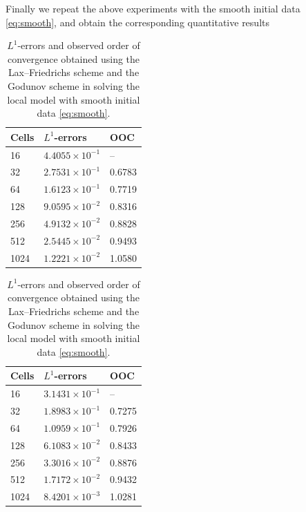 Finally we repeat the above experiments with the smooth initial data \eqref{eq:smooth}, and obtain the corresponding quantitative results
\begin{table}[H]
    \centering
    \begin{minipage}{0.45\textwidth}
        \centering
        \begin{tabular}{ |p{1.5cm}||p{2.2cm}| |p{1.5cm}| }
            \hline
            \textbf{Cells } & $L^{1}$-\textbf{errors} & \textbf{OOC} \\
            \hline
            16              & $4.4055 \times 10^{-1}$ & --           \\
            32              & $2.7531 \times 10^{-1}$ & 0.6783       \\
            64              & $1.6123 \times 10^{-1}$ & 0.7719       \\
            128             & $9.0595 \times 10^{-2}$ & 0.8316       \\
            256             & $4.9132 \times 10^{-2}$ & 0.8828       \\
            512             & $2.5445 \times 10^{-2}$ & 0.9493       \\
            1024            & $1.2221 \times 10^{-2}$ & 1.0580       \\
            \hline
        \end{tabular}
        \caption*{(a) Lax--Friedrichs scheme}
    \end{minipage}
    \hfill
    \begin{minipage}{0.5\textwidth}
        \centering
        \begin{tabular}{ |p{1.5cm}||p{2.2cm}| |p{1.5cm}| }
            \hline
            \textbf{Cells } & $L^{1}$-\textbf{errors}  & \textbf{OOC} \\
            \hline
            16              & $3.1431 \times 10^{-1}$  & --           \\
            32              & $1.8983 \times 10^{-1}$  & 0.7275       \\
            64              & $1.0959 \times 10^{-1}$  & 0.7926       \\
            128             & $6.1083 \times 10^{-2}$  & 0.8433       \\
            256             & $3.3016 \times 10^{-2}$  & 0.8876       \\
            512             & $1.7172 \times 10^{-2}$  & 0.9432       \\
            1024            & $ 8.4201 \times 10^{-3}$ & 1.0281       \\
            \hline
        \end{tabular}
        \caption*{(b) Godunov scheme}
    \end{minipage}

    \caption{$L^{1}$-errors and observed order of convergence obtained using the Lax--Friedrichs scheme and the Godunov scheme in solving the local model with smooth initial data \eqref{eq:smooth}.}
    \label{tab:table_3}
\end{table}
